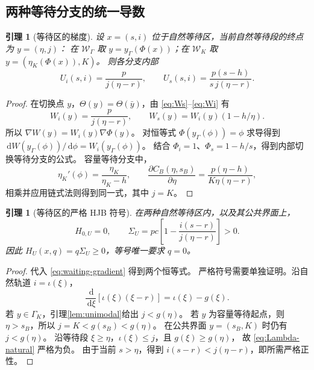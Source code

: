 \documentclass[11pt,a4paper,UTF8]{ctexart}
\newtheorem{lemma}[theorem]{引理}
\theoremstyle{definition}
\newcommand{\dd}{\,\mathrm d}
\begin{document}
\subsection{两种等待分支的统一导数}
\begin{lemma}[等待区的梯度]
\label{lem:waiting-gradient}
设 $x=(s,i)$ 位于自然等待区，当前自然等待段的终点为 $y=(\eta,j)$：
在 $\mathcal W_\Gamma$ 取 $y=y_\Gamma(\Phi(x))$；在 $\mathcal W_K$ 取 $y=(\eta_K(\Phi(x)),K)$。
则各分支内部
\begin{equation}
U_i(s,i)=\frac{p}{j(\eta-r)},\qquad
U_s(s,i)=\frac{p(s-h)}{s\,j(\eta-r)}.
\label{eq:waiting-gradient}
\end{equation}
\end{lemma}
\begin{proof}
在切换点 $y$，$\Theta(y)=\Theta(\bar y)$，由 \eqref{eq:Ws}--\eqref{eq:Wi} 有
\[
W_i(y)=\frac p{j(\eta-r)},\qquad
W_s(y)=W_i(y)(1-h/\eta).
\]
所以 $\nabla W(y)=W_i(y)\nabla\Phi(y)$。
对恒等式 $\Phi(y_\Gamma(\phi))=\phi$ 求导得到
$\dd W(y_\Gamma(\phi))/\dd\phi=W_i(y_\Gamma(\phi))$。
结合 $\Phi_i=1$、$\Phi_s=1-h/s$，得到内部切换等待分支的公式。
容量等待分支中，
\[
\eta_K'(\phi)=\frac{\eta_K}{\eta_K-h},\qquad
\frac{\partial C_B(\eta,s_B)}{\partial\eta}
=\frac{p(\eta-h)}{K\eta(\eta-r)},
\]
相乘并应用链式法则得到同一式，其中 $j=K$。
\end{proof}

\begin{lemma}[等待区的严格 HJB 符号]
\label{lem:waiting-HJB}
在两种自然等待区内，以及其公共界面上，
\begin{equation}
H_{0,U}=0,\qquad
\Sigma_U=pc\left[1-\frac{i(s-r)}{j(\eta-r)}\right]>0.
\label{eq:waiting-HJB}
\end{equation}
因此 $H_U(x,q)=q\Sigma_U\ge0$，等号唯一要求 $q=0$。
\end{lemma}
\begin{proof}
代入 \eqref{eq:waiting-gradient} 得到两个恒等式。
严格符号需要单独证明。沿自然轨道 $i=\iota(\xi)$，
\begin{equation}
\frac{\dd}{\dd\xi}[\iota(\xi)(\xi-r)]=\iota(\xi)-g(\xi).
\label{eq:Lambda-natural}
\end{equation}
若 $y\in\Gamma_K$，引理\ref{lem:unimodal}给出 $j<g(\eta)$。
若 $y$ 为容量等待起点，则 $\eta>s_B$，所以 $j=K<g(s_B)<g(\eta)$。
在公共界面 $y=(s_B,K)$ 时仍有 $j<g(\eta)$。
沿等待段 $\xi\ge\eta$，$\iota(\xi)\le j$，且 $g(\xi)\ge g(\eta)$，
故 \eqref{eq:Lambda-natural} 严格为负。
由于当前 $s>\eta$，得到 $i(s-r)<j(\eta-r)$，即所需严格正性。
\end{proof}
\end{document}
